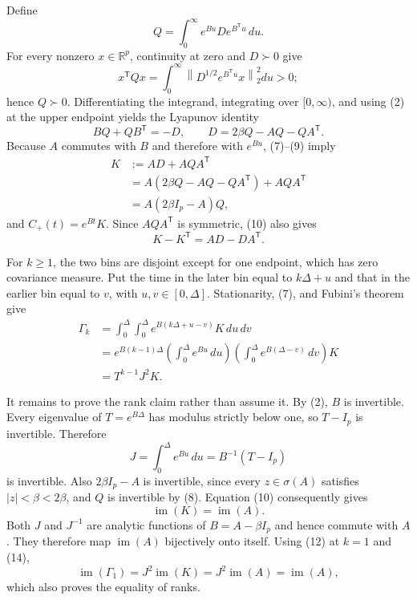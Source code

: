 Define
\[
 Q=\int_0^\infty e^{Bu}De^{B^{\mathsf T}u}\,du.
\]
For every nonzero \(x\in\mathbb R^p\), continuity at zero and \(D\succ0\) give
\[
 x^{\mathsf T}Qx
 =\int_0^\infty\left\|D^{1/2}e^{B^{\mathsf T}u}x\right\|_2^2du>0;
\tag{8}
\]
hence \(Q\succ0\).  Differentiating the integrand, integrating over \([0,\infty)\), and using (2) at the upper endpoint yields the Lyapunov identity
\[
 BQ+QB^{\mathsf T}=-D,\qquad
 D=2\beta Q-AQ-QA^{\mathsf T}.
\tag{9}
\]
Because \(A\) commutes with \(B\) and therefore with \(e^{Bu}\), (7)--(9) imply
\[
 \begin{aligned}
 K
 &:=AD+AQA^{\mathsf T}\\
 &=A(2\beta Q-AQ-QA^{\mathsf T})+AQA^{\mathsf T}\\
 &=A(2\beta I_p-A)Q,
 \end{aligned}
\tag{10}
\]
and \(C_+(t)=e^{Bt}K\).  Since \(AQA^{\mathsf T}\) is symmetric, (10) also gives
\[
 K-K^{\mathsf T}=AD-DA^{\mathsf T}.
\tag{11}
\]

For \(k\geq1\), the two bins are disjoint except for one endpoint, which has zero covariance measure.  Put the time in the later bin equal to \(k\Delta+u\) and that in the earlier bin equal to \(v\), with \(u,v\in[0,\Delta]\).  Stationarity, (7), and Fubini's theorem give
\[
 \begin{aligned}
 \Gamma_k
 &=\int_0^\Delta\int_0^\Delta e^{B(k\Delta+u-v)}K\,du\,dv\\
 &=e^{B(k-1)\Delta}
 \left(\int_0^\Delta e^{Bu}\,du\right)
 \left(\int_0^\Delta e^{B(\Delta-v)}\,dv\right)K\\
 &=T^{k-1}J^2K.
 \end{aligned}
\tag{12}
\]

It remains to prove the rank claim rather than assume it.  By (2), \(B\) is invertible.  Every eigenvalue of \(T=e^{B\Delta}\) has modulus strictly below one, so \(T-I_p\) is invertible.  Therefore
\[
 J=\int_0^\Delta e^{Bu}\,du=B^{-1}(T-I_p)
\tag{13}
\]
is invertible.  Also \(2\beta I_p-A\) is invertible, since every \(z\in\sigma(A)\) satisfies \(|z|<\beta<2\beta\), and \(Q\) is invertible by (8).  Equation (10) consequently gives
\[
 \operatorname{im}(K)=\operatorname{im}(A).
\tag{14}
\]
Both \(J\) and \(J^{-1}\) are analytic functions of \(B=A-\beta I_p\) and hence commute with \(A\).  They therefore map \(\operatorname{im}(A)\) bijectively onto itself.  Using (12) at \(k=1\) and (14),
\[
 \operatorname{im}(\Gamma_1)=J^2\operatorname{im}(K)
 =J^2\operatorname{im}(A)=\operatorname{im}(A),
\]
which also proves the equality of ranks.